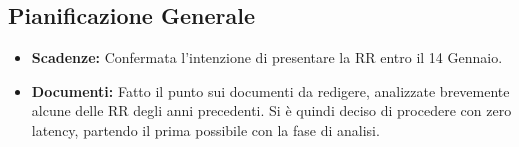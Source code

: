 \documentclass[a4paper, oneside, openany, dvipsnames, table]{article}
\begin{document}
\subsection{Pianificazione Generale}
\begin{itemize}
\item \textbf{Scadenze:} Confermata l’intenzione di presentare la RR entro il 14 Gennaio.
\item \textbf{Documenti:} Fatto il punto sui documenti da redigere, analizzate brevemente alcune delle RR degli anni precedenti. Si è quindi deciso di procedere con zero latency, partendo il prima possibile con la fase di analisi.
\end{itemize}


\newpage
\end{document}
